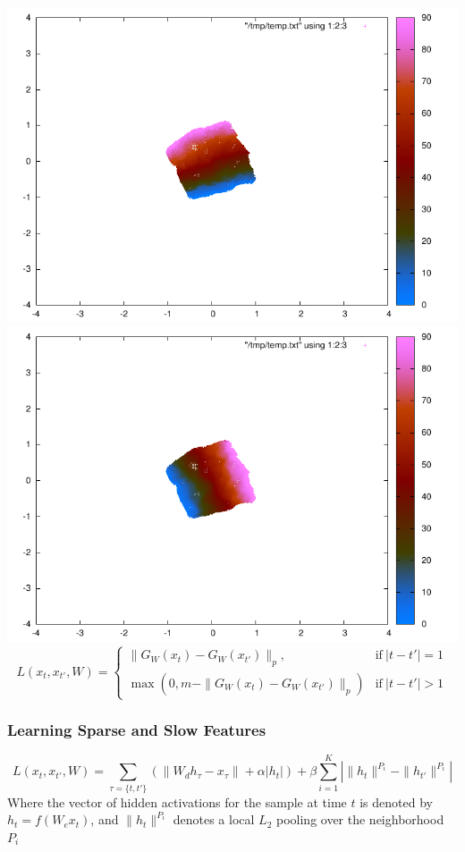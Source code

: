 \documentclass{beamer}
\begin{document}
\begin{frame}
\begin{center}
\includegraphics[scale=0.5,trim = 120 100 130 70, clip]{./images/TAE/drlim3.pdf} 
\includegraphics[scale=0.5,trim = 120 100 130 70, clip]{./images/TAE/drlim4.pdf}
\begin{equation} 
\nonumber
L(x_t,x_{t'},W)=\left\{
                \begin{array}{ll}
                 \|G_W(x_t) - G_W(x_{t'})\|_p, &\text{if}~|t-t'| = 1  \\
                 \max(0,m-\|G_W(x_t) - G_W(x_{t'})\|_p) &\text{if}~|t-t'| > 1
                \end{array}
              \right.
\end{equation} 
\end{center} 
\end{frame} 


\begin{frame}
\frametitle{Learning Sparse and Slow Features} 
\begin{equation}
\nonumber 
L(x_t,x_{t'},W)= \sum_{\tau = \{t,t'\}} \left(\|W_d h_\tau - x_\tau\| + \alpha|h_t| \right)+\beta \sum_{i=1}^K \left| \|h_t\|^{P_i} - \|h_{t'}\|^{P_i} \right|
\end{equation} 
Where the vector of hidden activations for the sample at time $t$ is denoted by $h_t=f(W_ex_t)$, and $\|h_t\|^{P_i}$ denotes a local $L_2$ pooling over the neighborhood $P_i$ 
\end{frame}
\end{document}
